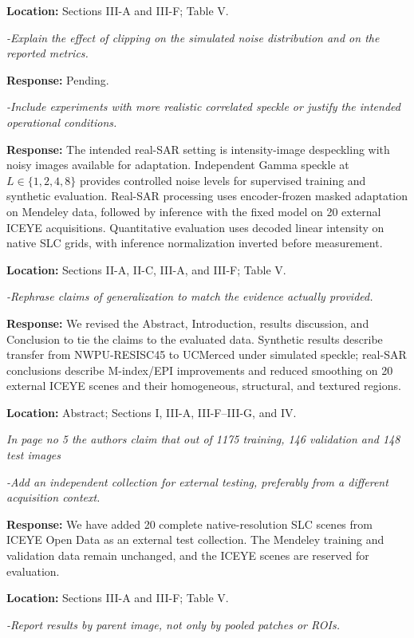 \documentclass[11pt,letterpaper]{article}
\newcommand{\pendingbullet}[1]{%
  \Needspace{4\baselineskip}%
  \textit{#1}\par
  {\small\textbf{Response:} Pending.}\par
  \vspace{3pt}%
}
\newcommand{\reviewgroup}[1]{%
  \Needspace{5\baselineskip}%
  \medskip\textit{#1}\par
}
\begin{document}
\textbf{Location:} Sections III-A and III-F; Table V.

\pendingbullet{-Explain the effect of clipping on the simulated noise distribution and on the reported metrics.}

\textit{-Include experiments with more realistic correlated speckle or justify the intended operational conditions.}

\textbf{Response:} The intended real-SAR setting is intensity-image despeckling with noisy images available for adaptation. Independent Gamma speckle at \(L\in\{1,2,4,8\}\) provides controlled noise levels for supervised training and synthetic evaluation. Real-SAR processing uses encoder-frozen masked adaptation on Mendeley data, followed by inference with the fixed model on 20 external ICEYE acquisitions. Quantitative evaluation uses decoded linear intensity on native SLC grids, with inference normalization inverted before measurement.

\textbf{Location:} Sections II-A, II-C, III-A, and III-F; Table V.

\textit{-Rephrase claims of generalization to match the evidence actually provided.}

\textbf{Response:} We revised the Abstract, Introduction, results discussion, and Conclusion to tie the claims to the evaluated data. Synthetic results describe transfer from NWPU-RESISC45 to UCMerced under simulated speckle; real-SAR conclusions describe M-index/EPI improvements and reduced smoothing on 20 external ICEYE scenes and their homogeneous, structural, and textured regions.

\textbf{Location:} Abstract; Sections I, III-A, III-F--III-G, and IV.

\reviewgroup{In page no 5 the authors claim that out of 1175 training, 146 validation and 148 test images}

\textit{-Add an independent collection for external testing, preferably from a different acquisition context.}

\textbf{Response:} We have added 20 complete native-resolution SLC scenes from ICEYE Open Data as an external test collection. The Mendeley training and validation data remain unchanged, and the ICEYE scenes are reserved for evaluation.

\textbf{Location:} Sections III-A and III-F; Table V.

\textit{-Report results by parent image, not only by pooled patches or ROIs.}
\end{document}
